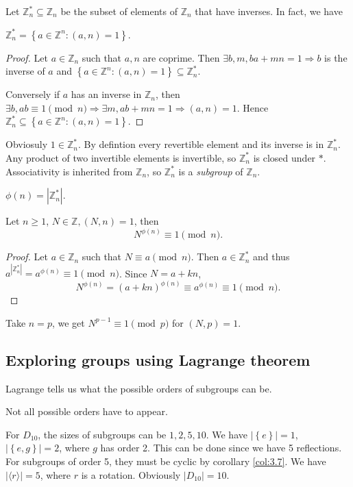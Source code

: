 \documentclass[10pt]{article}
\def\ge{\geqslant}
\begin{document}
    Let $ \mathbb{Z}_n^* \subseteq \mathbb{Z}_n $ be the subset of elements of $\mathbb{Z}_n$ that have inverses. In fact, we have 
    \begin{proposition}
        $ \mathbb{Z}_n^*=\left\{ a\in \mathbb{Z}^n: (a,n)=1\right\} $.
    \end{proposition}
    \begin{proof}
        Let $a\in \mathbb{Z}_n$ such that $a,n$ are coprime. Then $ \exists b,m, ba+mn=1 \Rightarrow b$ is the inverse of $a$ and $ \left\{ a\in \mathbb{Z}^n: (a,n)=1\right\} \subseteq \mathbb{Z}_n^* $.

        Conversely if $a$ has an inverse in $ \mathbb{Z}_n $, then $ \exists b, ab \equiv 1\pmod n \Rightarrow \exists m, ab+mn=1  \Rightarrow (a,n)=1$. Hence $\mathbb{Z}_n^* \subseteq \left\{ a\in \mathbb{Z}^n: (a,n)=1\right\}$. 
    \end{proof}
    Obviosuly $1\in \mathbb{Z}_n^*$. By defintion every revertible element and its inverse is in $\mathbb{Z}_n^*$. Any product of two invertible elements is invertible, so $\mathbb{Z}_n^*$ is closed under $*$. Associativity is inherited from $ \mathbb{Z}_n $, so $\mathbb{Z}_n^*$ is a \textit{subgroup} of $ \mathbb{Z}_n $.
    \begin{definition}
        $ \phi(n)=|\mathbb{Z}_n^*| $.
    \end{definition}
    \begin{theorem}\label{thm:fermat-euler}
        Let $n\ge 1$, $N\in \mathbb{Z}, (N,n)=1$, then
        \[
            N^{\phi(n)}\equiv 1\pmod n
        .\]
    \end{theorem}
    \begin{proof}
        Let $ a\in \mathbb{Z}_n $ such that $ N \equiv a \pmod{n} $. Then $a\in \mathbb{Z}_n^*$ and thus $ a^{|\mathbb{Z}_n^*|}=a^{\phi(n)} \equiv 1 \pmod{n} $. Since $ N=a+kn $,
        \[
            N^{\phi(n)}=(a+kn)^{\phi(n)} \equiv a^{\phi(n)}  \equiv 1 \pmod{n}.
        \]
    \end{proof}
    Take $n=p$, we get $ N^{p-1}\equiv 1\pmod{p} $ for $ (N,p)=1 $.
    \subsection{Exploring groups using Lagrange theorem}
    Lagrange tells us what the possible orders of subgroups can be.
    \begin{remark}
        Not all possible orders have to appear.
    \end{remark}
    \begin{example}
        For $D_{10}$, the sizes of subgroups can be $ 1,2,5,10 $. We have $ |\left\{ e\right\}|=1 $, $ |\left\{ e,g\right\}|=2 $, where $g$ has order 2. This can be done since we have 5 reflections. For subgroups of order 5, they must be cyclic by corollary \ref{col:3.7}. We have $ |\langle r \rangle |=5 $, where $r$ is a rotation. Obviously $ |D_{10}|=10 $.
    \end{example}
\end{document}
